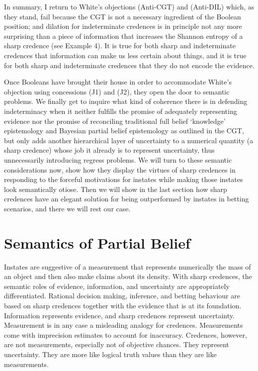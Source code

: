 \documentclass[journal]{IEEEtran}
\newcommand{\qnull}[1]{`#1'}
\begin{document}
In summary, I return to White's objections (Anti-CGT) and (Anti-DIL)
which, as they stand, fail because the CGT is not a necessary
ingredient of the Boolean position; and dilation for indeterminate
credences is in principle not any more surprising than a piece of
information that increases the Shannon entropy of a sharp credence
(see Example 4). It is true for both sharp and indeterminate credences
that information can make us less certain about things, and it is true
for both sharp and indeterminate credences that they do not encode the
evidence. 

Once Booleans have brought their house in order to accommodate White's
objection using concessions (J1) and (J2), they open the door to
semantic problems. We finally get to inquire what kind of coherence
there is in defending indeterminacy when it neither fulfills the
promise of adequately representing evidence nor the promise of
reconciling traditional full belief \qnull{knowledge} epistemology and
Bayesian partial belief epistemology as outlined in the CGT, but only
adds another hierarchical layer of uncertainty to a numerical quantity
(a sharp credence) whose job it already is to represent uncertainty,
thus unnecessarily introducing regress problems. We will turn to these
semantic considerations now, show how they display the virtues of
sharp credences in responding to the forceful motivations for instates
while making those instates look semantically otiose. Then we will
show in the last section how sharp credences have an elegant solution
for being outperformed by instates in betting scenarios, and there we
will rest our case.

\section{Semantics of Partial Belief}
\label{SemanticsOfPartialBelief}

Instates are suggestive of a measurement that represents numerically
the mass of an object and then also make claims about its density.
With sharp credences, the semantic roles of evidence, information, and
uncertainty are appropriately differentiated. Rational decision
making, inference, and betting behaviour are based on sharp credences
together with the evidence that is at its foundation. Information
represents evidence, and sharp credences represent uncertainty.
Measurement is in any case a misleading analogy for credences.
Measurements come with imprecision estimates to account for
inaccuracy. Credences, however, are not measurements, especially not
of objective chances. They represent uncertainty. They are more like
logical truth values than they are like measurements.
\end{document}
